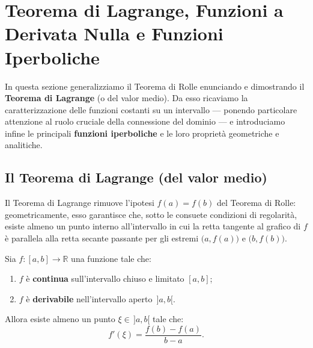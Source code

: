 \section{Teorema di Lagrange, Funzioni a Derivata Nulla e Funzioni Iperboliche}

In questa sezione generalizziamo il Teorema di Rolle enunciando e dimostrando il \textbf{Teorema di Lagrange} (o del valor medio). Da esso ricaviamo la caratterizzazione delle funzioni costanti su un intervallo — ponendo particolare attenzione al ruolo cruciale della connessione del dominio — e introduciamo infine le principali \textbf{funzioni iperboliche} e le loro proprietà geometriche e analitiche.

\subsection{Il Teorema di Lagrange (del valor medio)}

Il Teorema di Lagrange rimuove l'ipotesi $f(a) = f(b)$ del Teorema di Rolle: geometricamente, esso garantisce che, sotto le consuete condizioni di regolarità, esiste almeno un punto interno all'intervallo in cui la retta tangente al grafico di $f$ è parallela alla retta secante passante per gli estremi $\bigl(a, f(a)\bigr)$ e $\bigl(b, f(b)\bigr)$.

\begin{propbox}
Sia $f \colon [a,b] \to \mathbb{R}$ una funzione tale che:
\begin{enumerate}
    \item $f$ è \textbf{continua} sull'intervallo chiuso e limitato $[a,b]$;
    \item $f$ è \textbf{derivabile} nell'intervallo aperto $\,]a,b[$.
\end{enumerate}
Allora esiste almeno un punto $\xi \in \,]a,b[$ tale che:
\[
    f'(\xi) = \frac{f(b) - f(a)}{b - a}.
\]
\end{propbox}

